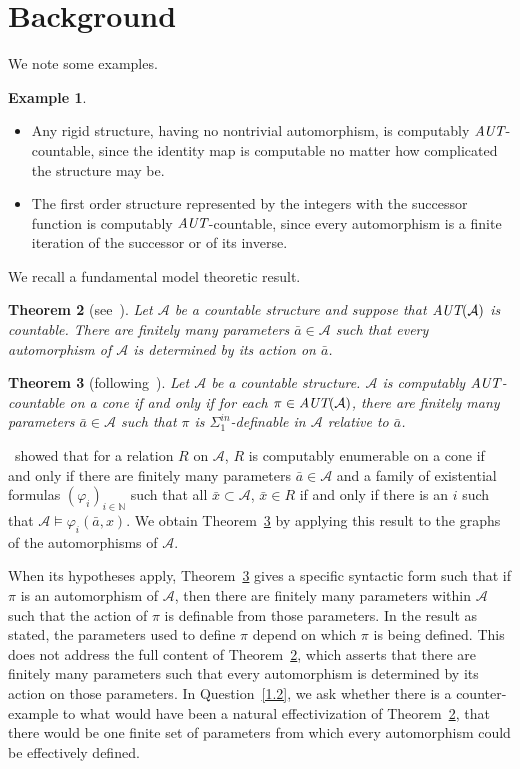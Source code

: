 \documentclass[12pt,fullpage]{article}
\newtheorem{theorem}{Theorem}[section]
\theoremstyle{definition}
\newtheorem{example}[theorem]{Example}
\theoremstyle{remark}
\newcommand{\A}{\mathcal{A}}
\renewcommand{\phi}{\varphi}
\newcommand{\N}{\mathbb{N}}
\newcommand{\AUT}{\mbox{\it AUT}}
\begin{document}
\section{Background}

We note some examples.

\begin{example}
  \begin{itemize}
  \item Any rigid structure, having no nontrivial automorphism, is computably $\AUT$-countable, since the identity map is computable no matter how complicated the structure may be.

  \item The first order structure represented by the integers with the successor function is computably $\AUT$-countable, since every automorphism is a finite iteration of the successor or of its inverse.  
  \end{itemize}
\end{example}


We recall a fundamental model theoretic result.

\begin{theorem}[see~]\label{2.2}
  Let $\A$ be a countable structure and suppose that $\AUT(\A)$ is countable.  There are finitely many parameters $\bar{a}\in\A$ such that every automorphism of $\A$ is determined by its action on $\bar{a}$.
\end{theorem}

\begin{theorem}[following~]\label{2.3}
  Let $\A$ be a countable structure.  $\A$ is computably $\AUT$-countable on a cone if and only if for each $\pi\in\AUT(\A)$, there are finitely many parameters $\bar{a}\in\A$ such that $\pi$ is $\Sigma^{in}_1$-definable in $\A$ relative to $\bar{a}$.
\end{theorem}

\cite{AshKniManSla89}\ showed that for a relation $R$ on $\A$, $R$ is computably enumerable on a cone if and only if there are finitely many parameters $\bar{a}\in\A$ and a family of existential formulas $(\phi_i)_{i\in\N}$ such that all $\bar{x}\subset\A$, $\bar{x}\in R$ if and only if there is an $i$ such that $\A\models\phi_i(\bar{a},x)$.  We obtain Theorem~\ref{2.3} by applying this result to the graphs of the automorphisms of $\A$.

When its hypotheses apply,  Theorem~\ref{2.3} gives a specific syntactic form such that if $\pi$ is an automorphism of $\A$, then there are finitely many parameters within $\A$ such that the action of $\pi$ is definable from those parameters.  In the result as stated, the parameters used to define $\pi$ depend on which $\pi$ is being defined.  This does not address the full content of Theorem~\ref{2.2}, which asserts that there are finitely many parameters such that every automorphism is determined by its action on those parameters.  In Question~\ref{1.2}, we ask whether there is a counter-example to what would have been a natural effectivization of Theorem~\ref{2.2}, that there would be one finite set of parameters from which every automorphism could be effectively defined.
\end{document}
